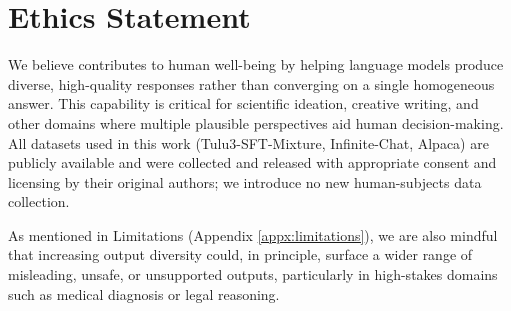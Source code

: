 \section{Ethics Statement}
We believe \method{} contributes to human well-being by helping language models produce diverse, high-quality responses rather than converging on a single homogeneous answer. This capability is critical for scientific ideation, creative writing, and other domains where multiple plausible perspectives aid human decision-making. All datasets used in this work (Tulu3-SFT-Mixture, Infinite-Chat, Alpaca) are publicly available and were collected and released with appropriate consent and licensing by their original authors; we introduce no new human-subjects data collection.

As mentioned in Limitations (Appendix \ref{appx:limitations}), we are also mindful that increasing output diversity could, in principle, surface a wider range of misleading, unsafe, or unsupported outputs, particularly in high-stakes domains such as medical diagnosis or legal reasoning.